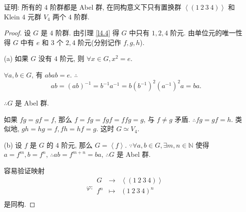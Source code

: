 \documentclass[color=black,device=normal,lang=cn,mode=geye]{elegantnote}
\begin{document}
\begin{exercise}\label{ex2.20}
    证明: 所有的 $4$ 阶群都是 Abel 群, 在同构意义下只有置换群 $\left<(1\ 2\ 3\ 4)\right>$ 和 Klein $4$ 元群 $V_4$ 两个 $4$ 阶群.
\end{exercise}
\begin{proof}
    设 $G$ 是 $4$ 阶群. 由引理 \ref{l4.4} 得 $G$ 中只有 $1,2,4$ 阶元. 由单位元的唯一性得 $G$ 中有 $e$ 和 $3$ 个 $2,4$ 阶元(分别记作 $f,g,h$).
    
    (a) 如果 $G$ 没有 $4$ 阶元, 则 $\forall x\in G,x^2=e$.

    $\forall a,b\in G$, 有 $abab=e$. $\therefore$
    \[ab=(ab)^{-1}=b^{-1}a^{-1}=b(b^{-1})^2(a^{-1})^2a=ba.\]
    
    $\therefore G$ 是 Abel 群.

    如果 $fg=gf=f$, 那么 $f=fg=fgf=ffg=g$, 与 $f\neq g$ 矛盾. $\therefore fg=gf=h$. 类似地, $gh=hg=f,fh=hf=g$. 这时 $G\simeq V_4$.

    (b) 设 $f$ 是 $G$ 的 $4$ 阶元, 那么 $G=\left<f\right>$. $\because\forall a,b\in G,\exists m,n\in\mathbb{N}$ 使得 $a=f^m,b=f^n$, $\therefore ab=f^{m+n}=ba$, $\therefore G$ 是 Abel 群.
    
    容易验证映射
    \[\varphi:\begin{array}{rcl}
        G & \to & \left<(1\ 2\ 3\ 4)\right> \\
        f^n & \mapsto & (1\ 2\ 3\ 4)^n \\
    \end{array}\]
    是同构.
\end{proof}
\end{document}
